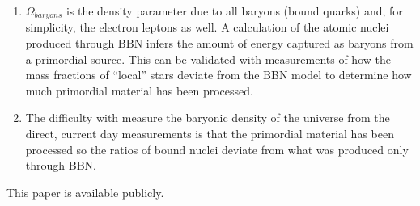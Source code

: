 \documentclass{paper}
\begin{document}
\begin{enumerate}
    \item %
      \(\Omega_{baryons}\) is the density parameter due to all baryons (bound
      quarks) and, for simplicity, the electron leptons as well. A
      calculation of the atomic nuclei produced through BBN infers the amount
      of energy captured as baryons from a primordial source. This can be
      validated with measurements of how the mass fractions of ``local'' stars
      deviate from the BBN model to determine how much primordial material
      has been processed.

    \item %
      The difficulty with measure the baryonic density of the universe from
      the direct, current day measurements is that the primordial material
      has been processed so the ratios of bound nuclei deviate from what
      was produced only through BBN.
      
\end{enumerate}

This paper is available publicly.\cite{Hayden_Cosmology_Source_Repo}

\pagebreak
\printbibliography
\end{document}
